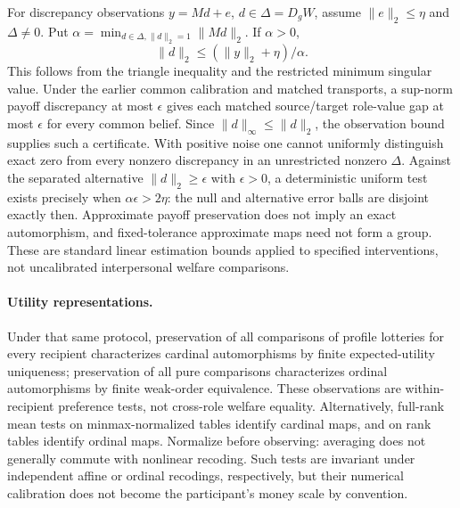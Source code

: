 For discrepancy observations $y=Md+e$, $d\in\Delta=D_gW$, assume
$\|e\|_2\le\eta$ and $\Delta\ne0$. Put
$\alpha=\min_{d\in\Delta,\|d\|_2=1}\|Md\|_2$. If $\alpha>0$,
\[
 \|d\|_2\le (\|y\|_2+\eta)/\alpha.
\]
This follows from the triangle inequality and the restricted minimum
singular value. Under the earlier common calibration and matched transports,
a sup-norm payoff discrepancy at most $\epsilon$ gives each matched source/target
role-value gap at most $\epsilon$ for every common belief. Since
$\|d\|_\infty\le\|d\|_2$, the observation bound supplies such a certificate.
With positive noise one cannot uniformly distinguish exact zero from every
nonzero discrepancy in an unrestricted nonzero $\Delta$. Against the
separated alternative $\|d\|_2\ge\epsilon$ with $\epsilon>0$, a deterministic uniform test
exists precisely when $\alpha\epsilon>2\eta$: the null and alternative
error balls are disjoint exactly then. Approximate payoff preservation does
not imply an exact automorphism, and fixed-tolerance approximate maps need
not form a group. These are standard linear estimation bounds applied to
specified interventions, not uncalibrated interpersonal welfare comparisons.

\paragraph{Utility representations.}
Under that same protocol, preservation of all comparisons of profile lotteries
for every recipient characterizes cardinal automorphisms by finite
expected-utility uniqueness; preservation of all pure comparisons characterizes
ordinal automorphisms by finite weak-order equivalence. These observations are
within-recipient preference tests, not cross-role welfare equality. Alternatively,
full-rank mean tests on minmax-normalized tables identify cardinal maps, and on
rank tables identify ordinal maps. Normalize before observing: averaging does
not generally commute with nonlinear recoding. Such tests are invariant under
independent affine or ordinal recodings, respectively, but their numerical
calibration does not become the participant's money scale by convention.
